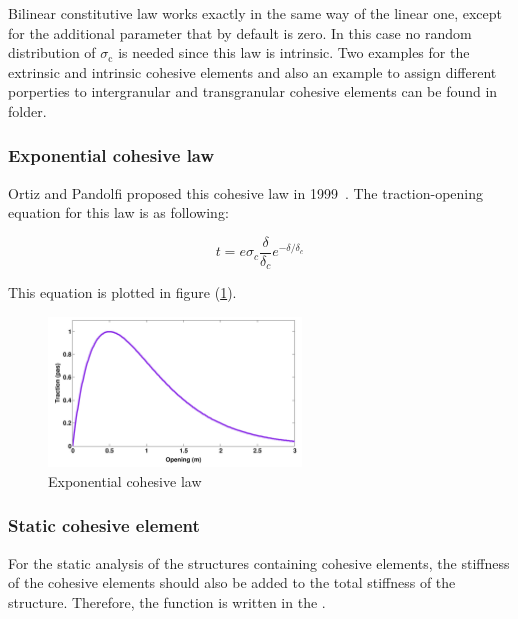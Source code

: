 Bilinear constitutive law works exactly in the same way of the linear
one, except for the additional parameter  that by
default is zero. In this case no random distribution of
$\sigma_\mathrm{c}$ is needed since this law is intrinsic.
Two examples for the extrinsic and intrinsic cohesive elements and also an example to assign different porperties to intergranular and transgranular cohesive elements can be 
found in \code{\examplesdir} folder.
\subsubsection{Exponential cohesive law}

Ortiz and Pandolfi proposed this cohesive law in 1999~\cite{ortiz1999}.  The
traction-opening equation for this law is as following:

\begin{equation}
  \label{eq:exponential_law}
  t = e \sigma_c \frac{\delta}{\delta_c}e^{-\delta/ \delta_c}
\end{equation}


This equation is plotted in figure (\ref{fig:smm:CL:ECL}).

 \begin{figure}[!htb]
    \begin{center}
      \includegraphics[width=0.6\textwidth,keepaspectratio=true]{figures/cohesive_exponential.pdf}
      \caption{Exponential cohesive law}
      \label{fig:smm:CL:ECL}
    \end{center}
  \end{figure}



\subsubsection{Static cohesive element}

For  the  static  analysis   of  the  structures  containing  cohesive
elements, the stiffness of the cohesive elements should also be added to the
total      stiffness       of      the      structure.      Therefore,
the  function    is written  in  the
.

